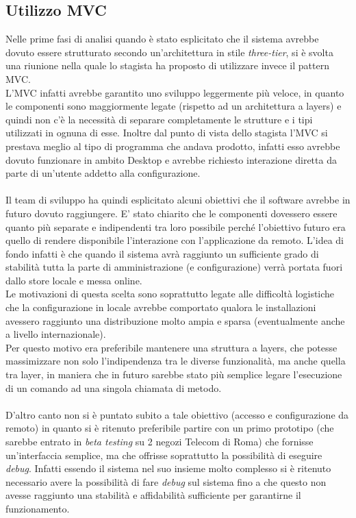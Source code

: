 \documentclass[a4paper,13pt,twoside]{article}
\begin{document}
\subsection{Utilizzo MVC} \label{sec:mvc}
Nelle prime fasi di analisi quando è stato esplicitato che il sistema avrebbe dovuto essere strutturato secondo un'architettura in stile \textit{three-tier}, si è svolta una riunione nella quale lo stagista ha proposto di utilizzare invece il pattern MVC. \\
L'MVC infatti avrebbe garantito uno sviluppo leggermente più veloce, in quanto le componenti sono maggiormente legate (rispetto ad un architettura a layers) e quindi non c'è la necessità di separare completamente le strutture e i tipi utilizzati in ognuna di esse. Inoltre dal punto di vista dello stagista l'MVC si prestava meglio al tipo di programma che andava prodotto, infatti esso avrebbe dovuto funzionare  in ambito Desktop e avrebbe richiesto interazione diretta da parte di un'utente addetto alla configurazione. \\ \\
Il team di sviluppo ha quindi esplicitato alcuni obiettivi che il software avrebbe in futuro dovuto raggiungere. E' stato chiarito che le componenti dovessero essere quanto più separate e indipendenti tra loro possibile perché l'obiettivo futuro era quello di rendere disponibile l'interazione con l'applicazione da remoto. L'idea di fondo infatti è che quando il sistema avrà raggiunto un sufficiente grado di stabilità tutta la parte di amministrazione (e configurazione) verrà portata fuori dallo store locale e messa online. \\
Le motivazioni di questa scelta sono soprattutto legate alle difficoltà logistiche che la configurazione in locale avrebbe comportato qualora le installazioni avessero raggiunto una distribuzione molto ampia e sparsa (eventualmente anche a livello internazionale). \\ 
Per questo motivo era preferibile mantenere una struttura a layers, che potesse massimizzare non solo l'indipendenza tra le diverse funzionalità, ma anche quella tra layer, in maniera che in futuro sarebbe stato più semplice legare l'esecuzione di un comando ad una singola chiamata di metodo. \\ \\
D'altro canto non si è puntato subito a tale obiettivo (accesso e configurazione da remoto) in quanto si è ritenuto preferibile partire con un primo prototipo (che sarebbe entrato in \textit{beta testing} su 2 negozi Telecom di Roma) che fornisse un'interfaccia semplice, ma che offrisse soprattutto la possibilità di eseguire \textit{debug}. Infatti essendo il sistema nel suo insieme molto complesso si è ritenuto necessario avere la possibilità di fare \textit{debug} sul sistema fino a che questo non avesse raggiunto una stabilità e affidabilità sufficiente per garantirne il funzionamento.
\end{document}
